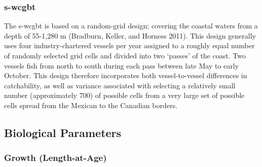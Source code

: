 \documentclass[11pt,
  english,
  a4paper,
]{article}
\begin{document}
\leavevmode\tagmcend\tagstructend\par


\hypertarget{section-2}{%
\subsubsection{\texorpdfstring{\acrlong{s-wcgbt}}{}}\label{section-2}}

\leavevmode\tagmcend\tagstructend


The \Gls{s-wcgbt} is based on a random-grid design; covering the coastal waters from a depth of 55-1,280 m {(Bradburn, Keller, and Horness 2011)\leavevmode\tagmcend\tagstructend}. This design generally uses four industry-chartered vessels per year assigned to a roughly equal number of randomly selected grid cells and divided into two `passes' of the coast. Two vessels fish from north to south during each pass between late May to early October. This design therefore incorporates both vessel-to-vessel differences in catchability, as well as variance associated with selecting a relatively small number (approximately 700) of possible cells from a very large set of possible cells spread from the Mexican to the Canadian borders.

\leavevmode\tagmcend\tagstructend\par


\hypertarget{biological-parameters}{%
\subsection{Biological Parameters}\label{biological-parameters}}

\leavevmode\tagmcend\tagstructend


\hypertarget{growth-length-at-age}{%
\subsubsection{Growth (Length-at-Age)}\label{growth-length-at-age}}

\leavevmode\tagmcend\tagstructend

\end{document}
